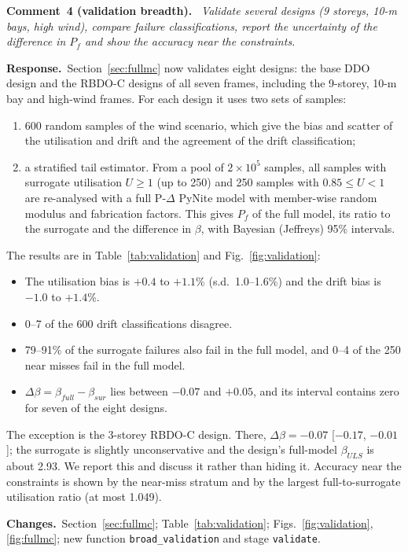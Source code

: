 \documentclass[11pt]{article}
\newcounter{rc}
\newenvironment{comment}[1]{\refstepcounter{rc}\par\medskip\noindent\textbf{Comment~#1.}\ \itshape}{\par}
\newcommand{\resp}{\par\noindent\textbf{Response.}\ }
\newcommand{\chg}{\par\noindent\textbf{Changes.}\ }
\begin{document}
\begin{comment}{4 (validation breadth)}
Validate several designs (9 storeys, 10-m bays, high wind), compare failure classifications, report
the uncertainty of the difference in $P_f$ and show the accuracy near the constraints.
\end{comment}
\resp Section~\ref{sec:fullmc} now validates eight designs: the base DDO design and the RBDO-C
designs of all seven frames, including the 9-storey, 10-m bay and high-wind frames. For each design
it uses two sets of samples:
\begin{enumerate}[label=(\alph*),itemsep=0.1em]
\item 600 random samples of the wind scenario, which give the bias and scatter of the utilisation and
drift and the agreement of the drift classification;
\item a stratified tail estimator. From a pool of $2\times10^5$ samples, all samples with surrogate
utilisation $U\ge1$ (up to 250) and 250 samples with $0.85\le U<1$ are re-analysed with a full P-$\Delta$
PyNite model with member-wise random modulus and fabrication factors. This gives $P_f$ of the full
model, its ratio to the surrogate and the difference in $\beta$, with Bayesian (Jeffreys) 95\%
intervals.
\end{enumerate}
The results are in Table~\ref{tab:validation} and Fig.~\ref{fig:validation}:
\begin{itemize}[itemsep=0.1em]
\item The utilisation bias is $+0.4$ to $+1.1$\% (s.d.\ 1.0--1.6\%) and the drift bias is $-1.0$ to
$+1.4$\%.
\item 0--7 of the 600 drift classifications disagree.
\item 79--91\% of the surrogate failures also fail in the full model, and 0--4 of the 250 near misses
fail in the full model.
\item $\Delta\beta=\beta_{full}-\beta_{sur}$ lies between $-0.07$ and $+0.05$, and its interval contains
zero for seven of the eight designs.
\end{itemize}
The exception is the 3-storey RBDO-C design. There, $\Delta\beta=-0.07$ [$-0.17$, $-0.01$]; the
surrogate is slightly unconservative and the design's full-model $\beta_{ULS}$ is about 2.93. We report
this and discuss it rather than hiding it. Accuracy near the constraints is shown by the near-miss
stratum and by the largest full-to-surrogate utilisation ratio (at most 1.049).
\chg Section~\ref{sec:fullmc}; Table~\ref{tab:validation}; Figs.~\ref{fig:validation}, \ref{fig:fullmc};
new function \texttt{broad\_validation} and stage \texttt{validate}.
\end{document}
